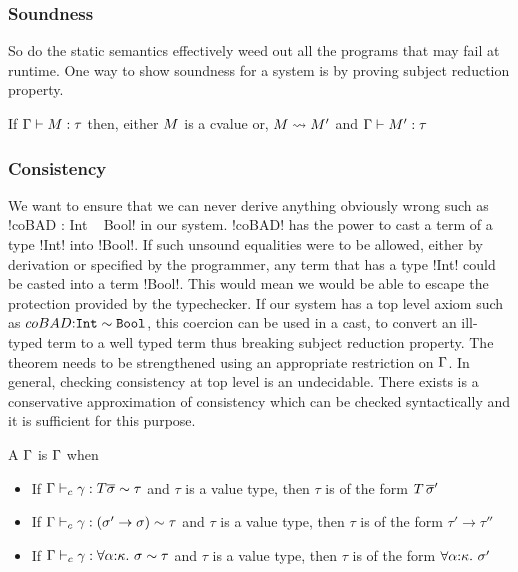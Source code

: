 \documentclass[manuscript,screen,nonacm]{acmart}
\begin{document}
\subsubsection{Soundness}
So do the static semantics effectively weed out all the programs that may fail at runtime. One way to show soundness for a system is by proving subject reduction property.

\begin{prop}\label{prop:sfc-ty-safety}
 If $\Gamma \vdash M : \tau$ then, either $M$ is a cvalue or, $M \rightsquigarrow M'$ and
 $\Gamma \vdash M' : \tau$
\end{prop}

\subsubsection{Consistency}
We want to ensure that we can never derive anything obviously wrong such as !coBAD : Int ~ Bool! in our system.
!coBAD! has the power to cast a term of a type !Int! into !Bool!. If such unsound equalities were to be allowed, either by derivation or specified by the programmer, any term that has a type !Int! could be casted into a term !Bool!. This would mean we would be able to escape the protection provided by the typechecker.
If our system has a top level axiom such as $coBAD {:} \texttt{Int} \sim \texttt{Bool}$, this coercion can be used in a cast, to convert an ill-typed term to a well typed term thus breaking subject reduction property. The theorem needs to be strengthened using an appropriate restriction on $\TEnv$. In general, checking consistency at top level is an undecidable. There exists is a conservative approximation of consistency which can be checked syntactically and it is sufficient for this purpose.

\begin{definition}[\Good $\TEnv$]
 A $\TEnv$ is \Good $\TEnv$ when
 \begin{itemize}
 \item If $\Gamma \vdash_{c} \gamma : T \overline{\sigma} \sim \tau$ and $\tau$ is a value type, then $\tau$ is of the form $T\,\overline{\sigma}'$
 \item If $\Gamma \vdash_{c} \gamma : (\sigma' \to \sigma) \sim \tau$ and $\tau$ is a value type, then $\tau$ is of the form $\tau' \to \tau''$
 \item If $\Gamma \vdash_{c} \gamma : \forall\alpha{:}\kappa.~\sigma \sim \tau$ and $\tau$ is a value type, then $\tau$ is of the form $\forall\alpha{:}\kappa.~\sigma'$
 \end{itemize}
\end{definition}
\end{document}
